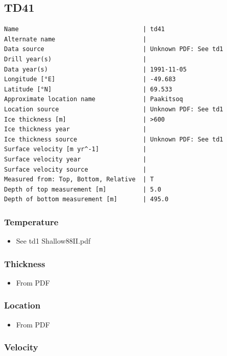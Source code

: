 \documentclass[article,a4paper,times,11pt,twoside]{article}
\begin{document}
\subsection{TD41}
\label{sec:org398b781}
\begin{verbatim}
Name                                  | td41
Alternate name                        | 
Data source                           | Unknown PDF: See td1
Drill year(s)                         | 
Data year(s)                          | 1991-11-05
Longitude [°E]                        | -49.683
Latitude [°N]                         | 69.533
Approximate location name             | Paakitsoq
Location source                       | Unknown PDF: See td1
Ice thickness [m]                     | >600
Ice thickness year                    | 
Ice thickness source                  | Unknown PDF: See td1
Surface velocity [m yr^-1]            | 
Surface velocity year                 | 
Surface velocity source               | 
Measured from: Top, Bottom, Relative  | T
Depth of top measurement [m]          | 5.0
Depth of bottom measurement [m]       | 495.0
\end{verbatim}

\subsubsection{Temperature}
\label{sec:org84e0af9}

\begin{itemize}
\item See td1 Shallow88II.pdf
\end{itemize}

\subsubsection{Thickness}
\label{sec:orgdcad4ee}

\begin{itemize}
\item From PDF
\end{itemize}

\subsubsection{Location}
\label{sec:orgb80930a}

\begin{itemize}
\item From PDF
\end{itemize}

\subsubsection{Velocity}
\label{sec:orgae0531b}
\clearpage
\end{document}
